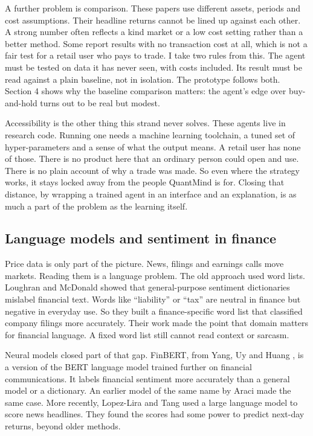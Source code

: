 \documentclass[12pt,twoside,letterpaper]{article}
\begin{document}
A further problem is comparison. These papers use different assets, periods and cost
assumptions. Their headline returns cannot be lined up against each other. A strong
number often reflects a kind market or a low cost setting rather than a better
method. Some report results with no transaction cost at all, which is not a fair
test for a retail user who pays to trade. I take two rules from this. The agent must
be tested on data it has never seen, with costs included. Its result must be read
against a plain baseline, not in isolation. The prototype follows both. Section 4
shows why the baseline comparison matters: the agent's edge over buy-and-hold turns
out to be real but modest.

Accessibility is the other thing this strand never solves. These agents live in
research code. Running one needs a machine learning toolchain, a tuned set of
hyper-parameters and a sense of what the output means. A retail user has none of
those. There is no product here that an ordinary person could open and use. There
is no plain account of why a trade was made. So even where the strategy works, it
stays locked away from the people QuantMind is for. Closing that distance, by
wrapping a trained agent in an interface and an explanation, is as much a part of
the problem as the learning itself.

\subsection{Language models and sentiment in finance}

Price data is only part of the picture. News, filings and earnings calls move
markets. Reading them is a language problem. The old approach used word lists.
Loughran and McDonald \cite{loughran2011} showed that general-purpose sentiment
dictionaries mislabel financial text. Words like ``liability'' or ``tax'' are
neutral in finance but negative in everyday use. So they built a finance-specific
word list that classified company filings more accurately. Their work made the
point that domain matters for financial language. A fixed word list still cannot
read context or sarcasm.

Neural models closed part of that gap. FinBERT, from Yang, Uy and Huang
\cite{yang2020}, is a version of the BERT language model trained further on
financial communications. It labels financial sentiment more accurately than a
general model or a dictionary. An earlier model of the same name by Araci
\cite{araci2019} made the same case. More recently, Lopez-Lira and Tang
\cite{lopezlira2023} used a large language model to score news headlines. They found
the scores had some power to predict next-day returns, beyond older methods.
\end{document}

